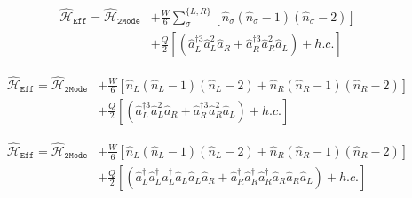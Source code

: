 \documentclass[aps,floatfix,showpacs,pra]{revtex4}
\begin{document}
\begin{equation}
\begin{split}
 \hat{\mathcal{H}}_\mathtt{Eff} = \hat{\mathcal{H}}_\mathtt{2Mode} &+ \frac{W}{6} \sum\limits_\sigma^{\{L,R\}} [\hat{n}_\sigma(\hat{n}_\sigma - 1)(\hat{n}_\sigma - 2)] \\
 &+ \frac{Q}{2} [(\hat{a}_L^{\dagger 3} \hat{a}_L^2 \hat{a}_R + \hat{a}_R^{\dagger 3} \hat{a}_R^2 \hat{a}_L) + h.c.]
 \end{split}
\end{equation}

\begin{equation}
\begin{split}
 \hat{\mathcal{H}}_\mathtt{Eff} = \hat{\mathcal{H}}_\mathtt{2Mode} &+ \frac{W}{6} [\hat{n}_L(\hat{n}_L - 1)(\hat{n}_L - 2) + \hat{n}_R(\hat{n}_R - 1)(\hat{n}_R - 2)] \\
 &+ \frac{Q}{2} [(\hat{a}_L^{\dagger 3} \hat{a}_L^2 \hat{a}_R + \hat{a}_R^{\dagger 3} \hat{a}_R^2 \hat{a}_L) + h.c.]
 \end{split}
\end{equation}

\begin{equation}
\begin{split}
 \hat{\mathcal{H}}_\mathtt{Eff} = \hat{\mathcal{H}}_\mathtt{2Mode} &+ \frac{W}{6} [\hat{n}_L(\hat{n}_L - 1)(\hat{n}_L - 2) + \hat{n}_R(\hat{n}_R - 1)(\hat{n}_R - 2)] \\
 &+ \frac{Q}{2} [(\hat{a}_L^\dagger \hat{a}_L^\dagger \hat{a}_L^\dagger \hat{a}_L \hat{a}_L \hat{a}_R + \hat{a}_R^\dagger \hat{a}_R^\dagger \hat{a}_R^\dagger \hat{a}_R \hat{a}_R \hat{a}_L) + h.c.]
 \end{split}
\end{equation}
\end{document}

